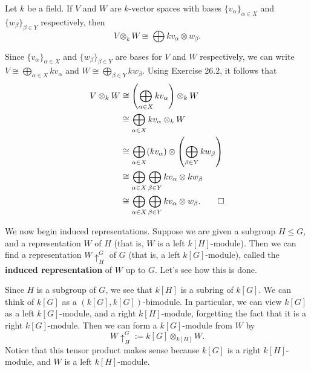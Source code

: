 \begin{cor}{}
    Let $k$ be a field. If $V$ and $W$ are $k$-vector spaces with bases 
    $\{v_\alpha\}_{\alpha\in X}$ and $\{w_\beta\}_{\beta\in Y}$ respectively, 
    then 
    \[ V \otimes_k W \cong \bigoplus kv_\alpha \otimes w_\beta. \] 
\end{cor}
\begin{pf}
    Since $\{v_\alpha\}_{\alpha\in X}$ and $\{w_\beta\}_{\beta\in Y}$ are 
    bases for $V$ and $W$ respectively, we can write $V \cong \bigoplus_{\alpha\in X}
    kv_\alpha$ and $W \cong \bigoplus_{\beta\in Y} kw_\beta$. Using 
    Exercise 26.2, it follows that 
    \begin{align*}
        V \otimes_k W 
        &\cong \left( \bigoplus_{\alpha\in X} kv_\alpha \right) \otimes_k W \\ 
        &\cong \bigoplus_{\alpha\in X} kv_\alpha \otimes_k W \\ 
        &\cong \bigoplus_{\alpha\in X} (kv_\alpha) \otimes 
        \left( \bigoplus_{\beta\in Y} kw_\beta \right) \\ 
        &\cong \bigoplus_{\alpha\in X} \bigoplus_{\beta\in Y} kv_\alpha \otimes kw_\beta \\ 
        &\cong \bigoplus_{\alpha\in X} \bigoplus_{\beta\in Y} kv_\alpha \otimes w_\beta. \qedhere 
    \end{align*}
\end{pf}

We now begin induced representations. Suppose we are given a subgroup 
$H \leq G$, and a representation $W$ of $H$ (that is, $W$ is a left 
$k[H]$-module). Then we can find a representation $W \uparrow_H^G$ of $G$ 
(that is, a left $k[G]$-module), called the {\bf induced representation} of $W$
up to $G$. Let's see how this is done. 

Since $H$ is a subgroup of $G$, we see that $k[H]$ is a subring of $k[G]$. 
We can think of $k[G]$ as a $(k[G], k[G])$-bimodule. In particular, we can 
view $k[G]$ as a left $k[G]$-module, and a right $k[H]$-module, forgetting 
the fact that it is a right $k[G]$-module. Then we can form a 
$k[G]$-module from $W$ by  
\[ W \uparrow_H^G := k[G] \otimes_{k[H]} W. \] 
Notice that this tensor product makes sense because $k[G]$ is a right 
$k[H]$-module, and $W$ is a left $k[H]$-module. 


